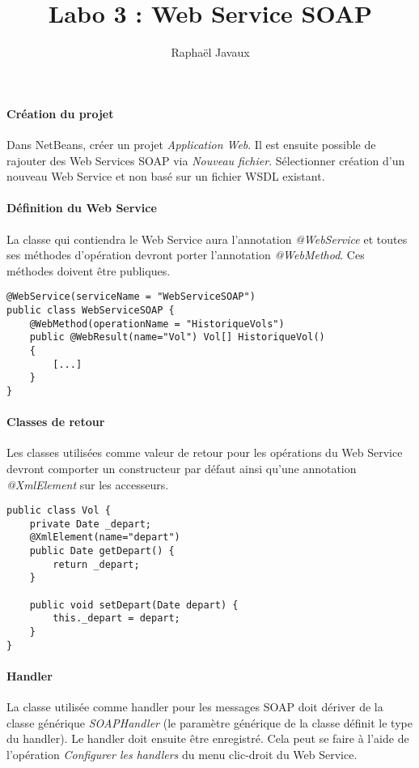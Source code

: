 \documentclass[a4paper,12pt,french]{article}
\title{Labo 3 : Web Service SOAP}
\author{Raphaël Javaux}
\date{}
\begin{document}
\maketitle 

\paragraph{Création du projet}
Dans NetBeans, créer un projet \textit{Application Web}.
Il est ensuite possible de rajouter des Web Services SOAP via \textit{Nouveau
fichier}. Sélectionner création d'un nouveau Web Service et non basé sur un
fichier WSDL existant.

\paragraph{Définition du Web Service}
La classe qui contiendra le Web Service aura l'annotation
\textit{@WebService} et toutes ses méthodes d'opération devront porter
l'annotation \textit{@WebMethod}. Ces méthodes doivent être publiques.

\begin{lstlisting}
@WebService(serviceName = "WebServiceSOAP")
public class WebServiceSOAP {
    @WebMethod(operationName = "HistoriqueVols")
    public @WebResult(name="Vol") Vol[] HistoriqueVol() 
    {
        [...]
    }
}
\end{lstlisting}

\paragraph{Classes de retour}
Les classes utilisées comme valeur de retour pour les opérations du Web
Service devront comporter un constructeur par défaut ainsi qu'une annotation
\textit{@XmlElement} sur les accesseurs. 

\begin{lstlisting}
public class Vol {
    private Date _depart; 
    @XmlElement(name="depart")
    public Date getDepart() {
        return _depart;
    }

    public void setDepart(Date depart) {
        this._depart = depart;
    }
}
\end{lstlisting}

\paragraph{Handler}
La classe utilisée comme handler pour les messages SOAP doit dériver de la
classe générique \textit{SOAPHandler} (le paramètre générique de la classe
définit le type du handler).
Le handler doit ensuite être enregistré. Cela peut se faire à l'aide de
l'opération \textit{Configurer les handlers} du menu clic-droit du Web Service.
\end{document}
